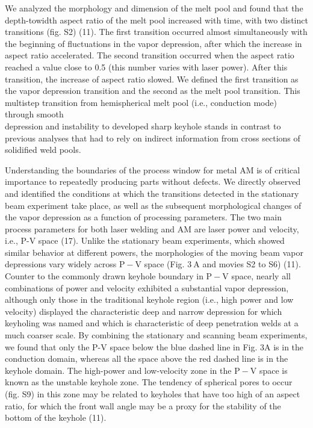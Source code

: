 \documentclass[10pt]{article}
\begin{document}
We analyzed the morphology and dimension of the melt pool and found that the depth-towidth aspect ratio of the melt pool increased with time, with two distinct transitions (fig. S2) (11). The first transition occurred almost simultaneously with the beginning of fluctuations in the vapor depression, after which the increase in aspect ratio accelerated. The second transition occurred when the aspect ratio reached a value close to 0.5 (this number varies with laser power). After this transition, the increase of aspect ratio slowed. We defined the first transition as the vapor depression transition and the second as the melt pool transition. This multistep transition from hemispherical melt pool (i.e., conduction mode) through smooth\\
depression and instability to developed sharp keyhole stands in contrast to previous analyses that had to rely on indirect information from cross sections of solidified weld pools.

Understanding the boundaries of the process window for metal AM is of critical importance to repeatedly producing parts without defects. We directly observed and identified the conditions at which the transitions detected in the stationary beam experiment take place, as well as the subsequent morphological changes of the vapor depression as a function of processing parameters. The two main process parameters for both laser welding and AM are laser power and velocity, i.e., P-V space (17). Unlike the stationary beam experiments, which showed similar behavior at different powers, the morphologies of the moving beam vapor depressions vary widely across $\mathrm{P}-\mathrm{V}$ space (Fig. $3 \mathrm{~A}$ and movies S2 to S6) (11). Counter to the commonly drawn keyhole boundary in $\mathrm{P}-\mathrm{V}$ space, nearly all combinations of power and velocity exhibited a substantial vapor depression, although only those in the traditional keyhole region (i.e., high power and low velocity) displayed the characteristic deep and narrow depression for which keyholing was named and which is characteristic of deep penetration welds at a much coarser scale. By combining the stationary and scanning beam experiments, we found that only the P-V space below the blue dashed line in Fig. 3A is in the conduction domain, whereas all the space above the red dashed line is in the keyhole domain. The high-power and low-velocity zone in the $\mathrm{P}-\mathrm{V}$ space is known as the unstable keyhole zone. The tendency of spherical pores to occur (fig. S9) in this zone may be related to keyholes that have too high of an aspect ratio, for which the front wall angle may be a proxy for the stability of the bottom of the keyhole (11).
\end{document}
